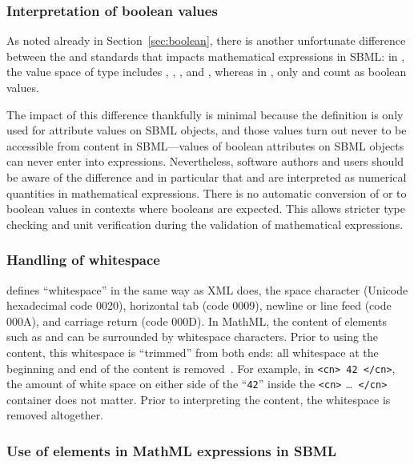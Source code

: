 \subsubsection{Interpretation of boolean values}
\label{sec:handling-booleans}

As noted already in Section~\ref{sec:boolean}, there is another
unfortunate difference between the \xmlschemaone and \mathmltwo
standards that impacts mathematical expressions in SBML: in
\xmlschema, the value space of type  includes
, , , and , whereas in
\mathml, only  and  count as boolean
values.

The impact of this difference thankfully is minimal because the
\xmlschema definition is only used for attribute values on SBML
objects, and those values turn out never to be accessible from
\mathml content in SBML---values of boolean attributes on SBML objects
can never enter into \mathml expressions.  Nevertheless, software
authors and users should be aware of the difference and in
particular that  and  are interpreted as numerical
quantities in mathematical expressions.  There is no automatic
conversion of  or  to boolean values in contexts
where booleans are expected.  This allows stricter type checking
and unit verification during the validation of mathematical
expressions.


\subsubsection{Handling of whitespace}
\label{sec:mathml-whitespace}

\mathmltwo defines ``whitespace'' in the same way as XML does, \ie
the space character (Unicode hexadecimal code 0020), horizontal
tab (code 0009), newline or line feed (code 000A), and carriage
return (code 000D).  In MathML, the content of elements such as
 and  can be surrounded by whitespace
characters.  Prior to using the content, this whitespace is
``trimmed'' from both ends: all whitespace at the beginning and
end of the content is removed~\citep{ausbrooks:2003}.  For
example, in \texttt{<cn> 42 </cn>}, the amount of white space on
either side of the ``\texttt{42}'' inside the \texttt{<cn>}
\ldots\ \texttt{</cn>} container does not matter.  Prior to
interpreting the content, the whitespace is removed altogether.


\subsubsection{Use of  elements in MathML expressions in SBML}
\label{sec:csymbol-token}
\label{sec:csymbol}

